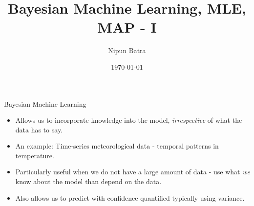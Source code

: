 \documentclass{beamer}
\title{Bayesian Machine Learning, MLE, MAP - I}
\date{\today}
\author{Nipun Batra}
\institute{IIT Gandhinagar}
\begin{document}
\maketitle

\begin{frame}{Bayesian Machine Learning}
\begin{itemize}
\item Allows us to incorporate knowledge into the model, \emph{irrespective} of what the data has to say. 
\item An example: Time-series meteorological data - temporal patterns in temperature.
\item Particularly useful when we do not have a large amount of data - use what \emph{we} know about the model than depend on the data.
\item Also allows us to predict with confidence quantified typically using variance.
\end{itemize}
\end{frame}



 
 
  
  

	
	
	
\end{document}
